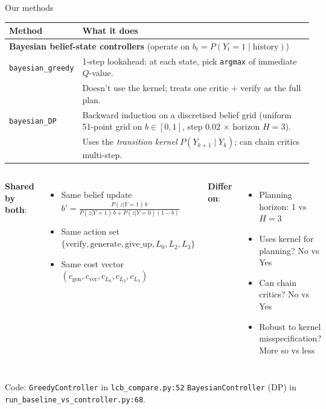 \documentclass[10pt]{beamer}
\begin{document}
\begin{frame}{Our methods}
\vspace{0.2cm}
\begin{table}
\centering
\small
\begin{tabular}{p{4.1cm}p{6.4cm}}
\toprule
\textcolor{primaryBlue}{\textbf{Method}} & \textcolor{primaryBlue}{\textbf{What it does}} \\
\midrule
\multicolumn{2}{l}{\textcolor{accentGreen}{\textbf{Bayesian belief-state controllers}} (operate on $b_t = P(Y_t{=}1 \mid \text{history})$)} \\
\addlinespace[2pt]
\texttt{bayesian\_greedy} & \textcolor{accentGreen}{1-step lookahead}: at each state, pick \texttt{argmax} of immediate $Q$-value. \\
& \textcolor{softGrey}{\footnotesize Doesn't use the kernel; treats one critic + verify as the full plan.} \\
\addlinespace[3pt]
\texttt{bayesian\_DP} & \textcolor{accentGreen}{Backward induction} on a discretised belief grid (uniform 51-point grid on $b \in [0,1]$, step $0.02$ $\times$ horizon $H{=}3$). \\
& \textcolor{softGrey}{\footnotesize Uses the \emph{transition kernel} $P(Y_{k+1}\mid Y_k)$; can chain critics multi-step.} \\
\bottomrule
\end{tabular}
\end{table}

\vspace{0.25cm}
\begin{columns}[T]
\textcolor{accentGreen}{\textbf{Shared by both}}:
\begin{itemize}\setlength\itemsep{0.5pt}
\item \footnotesize Same belief update $b' = \frac{P(z|Y{=}1)\,b}{P(z|Y{=}1)\,b + P(z|Y{=}0)(1-b)}$
\item \footnotesize Same action set $\{\text{verify}, \text{generate}, \text{give\_up}, L_0, L_2, L_3\}$
\item \footnotesize Same cost vector $(c_\text{gen}, c_\text{ver}, c_{L_0}, c_{L_2}, c_{L_3})$
\end{itemize}

\textcolor{accentRed}{\textbf{Differ on}}:
\begin{itemize}\setlength\itemsep{0.5pt}
\item \footnotesize Planning horizon: 1 vs $H{=}3$
\item \footnotesize Uses kernel for planning? No vs Yes
\item \footnotesize Can chain critics? No vs Yes
\item \footnotesize Robust to kernel misspecification? More so vs less
\end{itemize}
\end{columns}

\vspace{0.2cm}
\textcolor{softGrey}{\scriptsize Code: \texttt{GreedyController} in \texttt{lcb\_compare.py:52} \quad
\texttt{BayesianController} (DP) in \texttt{run\_baseline\_vs\_controller.py:68}.}
\end{frame}
\end{document}
